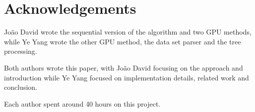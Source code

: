 \documentclass[runningheads]{llncs}
\begin{document}
\section*{Acknowledgements}

João David wrote the sequential version of the algorithm and two GPU methods, while Ye Yang wrote the other GPU method, the data set parser and the tree processing.

Both authors wrote this paper, with João David focusing on the approach and introduction while Ye Yang focused on implementation details, related work and conclusion.

Each author spent around 40 hours on this project.

\nocite{*}


\end{document}
